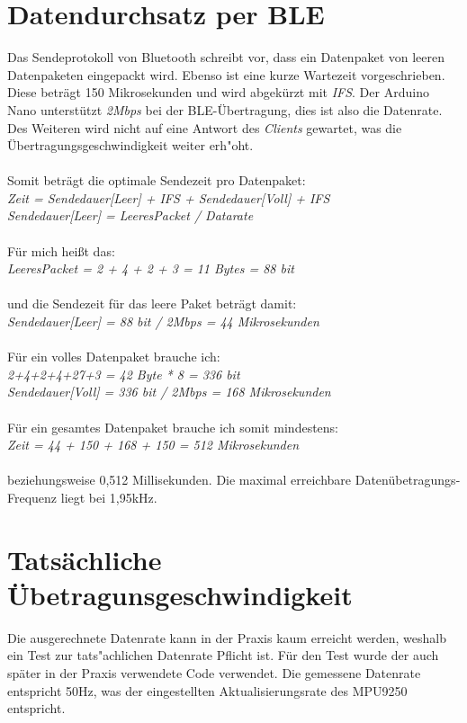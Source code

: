 \section{Datendurchsatz per BLE}

Das Sendeprotokoll von Bluetooth schreibt vor, dass ein Datenpaket von
leeren Datenpaketen eingepackt wird. Ebenso ist eine kurze Wartezeit vorgeschrieben. 
Diese beträgt 150 Mikrosekunden und wird abgekürzt mit \textit{IFS}.
Der Arduino Nano unterstützt \textit{2Mbps} bei der BLE-Übertragung, dies ist also die Datenrate.
Des Weiteren wird nicht auf eine Antwort des \textit{Clients} gewartet, was die 
Übertragungsgeschwindigkeit weiter erh"oht.\\
\\
Somit beträgt die optimale Sendezeit pro Datenpaket:\\
\textit{Zeit = Sendedauer[Leer] + IFS + Sendedauer[Voll] + IFS\\
Sendedauer[Leer] = LeeresPacket / Datarate}\\
\\
Für mich heißt das:\\
\textit{LeeresPacket = 2 + 4 + 2 + 3 = 11 Bytes = 88 bit}\\
\\
und die Sendezeit für das leere Paket beträgt damit:\\
\textit{Sendedauer[Leer] = 88 bit / 2Mbps = 44 Mikrosekunden}\\
\\
Für ein volles Datenpaket brauche ich:\\
\textit{2+4+2+4+27+3 = 42 Byte * 8 = 336 bit\\
Sendedauer[Voll] = 336 bit / 2Mbps = 168 Mikrosekunden}\\
\\
Für ein gesamtes Datenpaket brauche ich somit mindestens:\\
\textit{Zeit = 44 + 150 + 168 + 150 = 512 Mikrosekunden}\\
\\
beziehungsweise 0,512 Millisekunden. Die maximal erreichbare Datenübetragungs-Frequenz
liegt bei 1,95kHz.


\section{Tatsächliche Übetragunsgeschwindigkeit}
Die ausgerechnete Datenrate kann in der Praxis kaum erreicht werden, weshalb ein Test zur 
tats"achlichen Datenrate Pflicht ist. Für den Test wurde der auch später in der Praxis verwendete
Code verwendet. Die gemessene Datenrate entspricht 50Hz, was der eingestellten Aktualisierungsrate 
des MPU9250 entspricht.  
